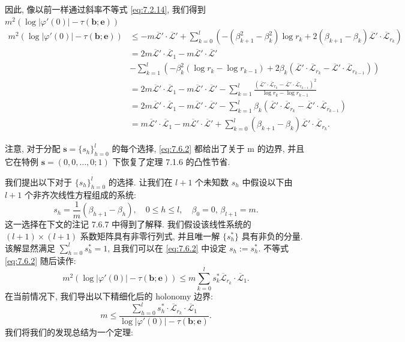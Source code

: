 因此, 像以前一样通过斜率不等式 \eqref{eq:7.2.14}, 我们得到 \(m^2 (\log |\varphi'(0)| - \tau(\mathbf{b}; \mathbf{e}))\)
\begin{equation}\label{eq:7.6.2}
    \begin{aligned}
        m^2 (\log |\varphi'(0)| - \tau(\mathbf{b}; \mathbf{e})) 
        &\leq -m\overline{\mathcal{L}}' \cdot \overline{\mathcal{L}}' + \sum_{k=0}^{l} \left( -(\beta_{k+1}^{2} - \beta_{k}^{2}) \log r_{k} + 2(\beta_{k+1} - \beta_{k}) \overline{\mathcal{L}}' \cdot \overline{\mathcal{L}}_{r_{k}} \right) \\
        &= 2m\overline{\mathcal{L}}' \cdot \overline{\mathcal{L}}_{1} - m\overline{\mathcal{L}}' \cdot \overline{\mathcal{L}}' \\
        &- \sum_{k=1}^{l} \left( -\beta_{k}^{2} (\log r_{k} - \log r_{k-1}) + 2\beta_{k} (\overline{\mathcal{L}}' \cdot \overline{\mathcal{L}}_{r_{k}} - \overline{\mathcal{L}}' \cdot \overline{\mathcal{L}}_{r_{k-1}}) \right) \\
        &= 2m\overline{\mathcal{L}}' \cdot \overline{\mathcal{L}}_{1} - m\overline{\mathcal{L}}' \cdot \overline{\mathcal{L}}' - \sum_{k=1}^{l} \frac{(\overline{\mathcal{L}}' \cdot \overline{\mathcal{L}}_{r_{k}} - \overline{\mathcal{L}}' \cdot \overline{\mathcal{L}}_{r_{k-1}})^{2}}{\log r_{k} - \log r_{k-1}} \\
        &= 2m\overline{\mathcal{L}}' \cdot \overline{\mathcal{L}}_{1} - m\overline{\mathcal{L}}' \cdot \overline{\mathcal{L}}' - \sum_{k=1}^{l} \beta_{k} (\overline{\mathcal{L}}' \cdot \overline{\mathcal{L}}_{r_{k}} - \overline{\mathcal{L}}' \cdot \overline{\mathcal{L}}_{r_{k-1}}) \\
        &= m\overline{\mathcal{L}}' \cdot \overline{\mathcal{L}}_{1} - m\overline{\mathcal{L}}' \cdot \overline{\mathcal{L}}' + \sum_{k=0}^{l} (\beta_{k+1} - \beta_{k}) \overline{\mathcal{L}}' \cdot \overline{\mathcal{L}}_{r_{k}}.
    \end{aligned}
\end{equation}

注意, 对于分配 \(\mathbf{s} = \{s_h\}_{h=0}^l\) 的每个选择, \eqref{eq:7.6.2} 都给出了关于 m 的边界, 
并且它在特例 \(\mathbf{s} = (0, 0, \dots, 0; 1)\) 下恢复了定理 7.1.6 的凸性节省.

我们提出以下对于 \(\{s_h\}_{h=0}^l\) 的选择. 
让我们在 \(l+1\) 个未知数 \(s_h\) 中假设以下由 \(l+1\) 个非齐次线性方程组成的系统:
\begin{equation}\label{eq:7.6.3}
s_h = \frac{1}{m}(\beta_{h+1} - \beta_h), \quad 0 \le h \le l, \quad \beta_0 = 0, \, \beta_{l+1} = m.
\end{equation}
这一选择在下文的注记 7.6.7 中得到了解释. 
我们假设该线性系统的 \((l+1) \times (l+1)\) 系数矩阵具有非零行列式, 
并且唯一解 \(\{s_h^*\}\) 具有非负的分量. 该解显然满足 \(\sum_{h=0}^{l} s_h^* = 1\), 
且我们可以在 \eqref{eq:7.6.2} 中设定 \(s_h := s_h^*\). 
不等式 \eqref{eq:7.6.2} 随后读作:
\[ m^2(\log |\varphi'(0)| - \tau(\mathbf{b}; \mathbf{e})) \le m \sum_{k=0}^l s_k^* \overline{\mathcal{L}}_{r_k} \cdot \overline{\mathcal{L}}_1. \]
在当前情况下, 我们导出以下精细化后的 holonomy 边界:
\[ m \leq \frac{\sum_{h=0}^{l} s_h^* \cdot \overline{\mathcal{L}}_{r_k} \cdot \overline{\mathcal{L}}_1}{\log |\varphi'(0)| - \tau(\mathbf{b}; \mathbf{e})}. \]
我们将我们的发现总结为一个定理:

